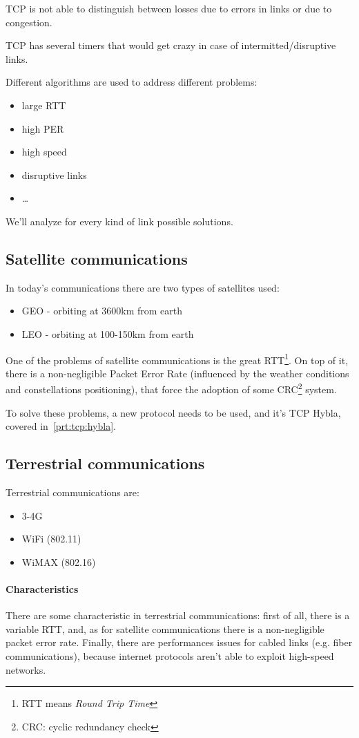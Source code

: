TCP is not able to distinguish between losses due to errors in links or due
to congestion.

TCP has several timers that would get crazy in case of intermitted/disruptive
links.

Different algorithms are used to address different problems:

\begin{itemize}
  \item large RTT
  \item high PER
  \item high speed
  \item disruptive links
  \item \dots
\end{itemize}

We'll analyze for every kind of link possible solutions.

\subsection{Satellite communications}
In today's communications there are two types of satellites used:
\begin{itemize}
\item GEO - orbiting at 3600km from earth
\item LEO - orbiting at 100-150km from earth
\end{itemize}
One of the problems of satellite communications is the great RTT\footnote{RTT
  means \textit{Round Trip Time}}. On top of it, there is a non-negligible
Packet Error Rate (influenced by the weather conditions and constellations
positioning), that force the adoption of some CRC\footnote{CRC: cyclic
redundancy check} system.

To solve these problems, a new protocol needs to be used, and it's TCP Hybla,
covered in~\ref{prt:tcp:hybla}.

\subsection{Terrestrial communications}
Terrestrial communications are:
\begin{itemize}
\item 3-4G
\item WiFi (802.11) 
\item WiMAX (802.16)
\end{itemize}

\paragraph*{Characteristics} There are some characteristic in terrestrial
communications: first of all, there is a variable RTT, and, as for satellite
communications there is a non-negligible packet error rate. Finally, there are
performances issues for cabled links (e.g. fiber communications), because
internet protocols aren't able to exploit high-speed networks.

